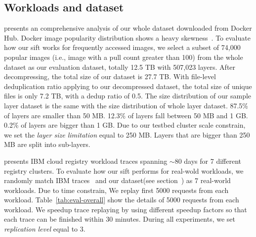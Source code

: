 \subsection{Workloads and dataset}
\cite{xxx} presents an comprehensive analysis of our whole dataset downloaded from Docker Hub. 
Docker image popularity distribution shows a heavy skewness~\cite{xxx}.
To evaluate how our sift works for frequently accessed images,
we select a subset of 74,000 popular images (i.e., image with a pull count greater than 100) from the whole dataset 
as our evaluation dataset, 
totally 12.5 TB with 507,023 layers.
After decompressing,  the total size of our dataset is 27.7 TB.
With file-level deduplication ratio applying to our decompressed dataset, 
the total size of unique files is only 7.2 TB, with a dedup ratio of 0.5.
The size distribution of our sample layer dataset is the same with the size distribution of whole layer dataset.
87.5\% of layers are smaller than 50 MB.
12.3\% of layers fall between 50 MB and 1 GB.
0.2\% of layers are bigger than 1 GB.
Due to our testbed cluster scale constrain, we set the \emph{layer size limitation} equal to 250 MB. 
Layers that are bigger than 250 MB are split into sub-layers.

\cite{dockerworkload} presents IBM cloud registry workload traces spanning $\sim$80 days for 7 different registry clusters. 
To evaluate how our sift performs for real-wold workloads,
we randomly match IBM traces~\cite{xxx} and our dataset(see section~\cite{xxx}) as 7 real-world workloads. 
Due to time constrain,
We replay first 5000 requests from each workload.
Table~\ref{tab:eval-overall} show the details of 5000 requests from each workload.
We speedup trace replaying by using different speedup factors
so that each trace can be finished within 30 minutes.
During all experiments,
we set \emph{replication level} equal to 3.




